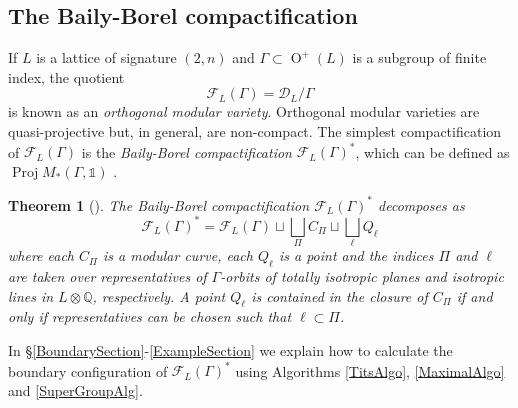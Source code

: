 \documentclass[12pt, a4paper]{article}
\newtheorem{theorem}{Theorem}[section]
\newcommand{\QQ}{\mathbb{Q}}
\newcommand{\beq}{\begin{equation*}}
\newcommand{\eeq}{\end{equation*}}
\newcommand{\dc}{\mathcal{D}}
\newcommand{\fc}{\mathcal{F}}
\newcommand{\opn}{\operatorname}
\begin{document}
\subsection{The Baily-Borel compactification}
If $L$ is a lattice of signature $(2, n)$ and $\Gamma \subset \opn{O}^+(L)$ is a subgroup of finite index, the quotient
\beq
\fc_L(\Gamma) = \dc_L/ \Gamma
\eeq
is known as an \emph{orthogonal modular variety}.
Orthogonal modular varieties are quasi-projective \cite{bailyborel} but, in general, are non-compact.
The simplest compactification of $\fc_L(\Gamma)$ is the \emph{Baily-Borel compactification} $\fc_L(\Gamma)^*$, which can be defined as $\opn{Proj} M_*(\Gamma, \mathds{1})$ \cite{bailyborel}.
\begin{theorem}[\hspace{1sp}\cite{handbook}]\label{BailyBorelThm}
  The Baily-Borel compactification $\fc_L(\Gamma)^*$ decomposes  as
  \beq
  \fc_L(\Gamma)^* = \fc_L(\Gamma) \sqcup \bigsqcup_{\Pi} C_{\Pi} \sqcup \bigsqcup_{\ell} Q_{\ell} 
  \eeq
where each $C_{\Pi}$ is a modular curve, each $Q_{\ell}$ is a point and the indices $\Pi$ and $\ell$ are taken over representatives of $\Gamma$-orbits of totally isotropic planes and isotropic lines in $L \otimes \QQ$, respectively.
A point $Q_{\ell}$ is contained in the closure of $C_{\Pi}$ if and only if representatives can be chosen such that $\ell \subset \Pi$.
\end{theorem}
In \S\ref{BoundarySection}-\ref{ExampleSection} we explain how to calculate the boundary configuration of $\fc_L(\Gamma)^*$ using
Algorithms \ref{TitsAlgo}, \ref{MaximalAlgo} and \ref{SuperGroupAlg}.
\end{document}
